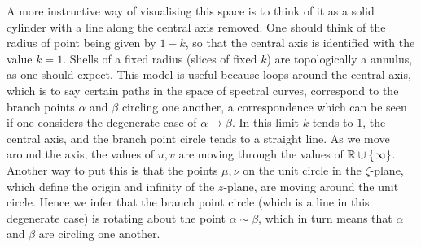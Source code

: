 A more instructive way of visualising this space is to think of it as a solid cylinder with a line along the central axis removed. One should think of the radius of point being given by $1-k$, so that the central axis is identified with the value $k=1$. Shells of a fixed radius (slices of fixed $k$) are topologically a annulus, as one should expect. This model is useful because loops around the central axis, which is to say certain paths in the space of spectral curves, correspond to the branch points $α$ and $β$ circling one another, a correspondence which can be seen if one considers the degenerate case of $α\to β$. In this limit $k$ tends to $1$, the central axis, and the branch point circle tends to a straight line. As we move around the axis, the values of $u,v$ are moving through the values of $\mathbb{R}\cup\{\infty\}$. Another way to put this is that the points $μ,ν$ on the unit circle in the $ζ$-plane, which define the origin and infinity of the $z$-plane, are moving around the unit circle. Hence we infer that the branch point circle (which is a line in this degenerate case) is rotating about the point $α\sim β$, which in turn means that $α$ and $β$ are circling one another.







